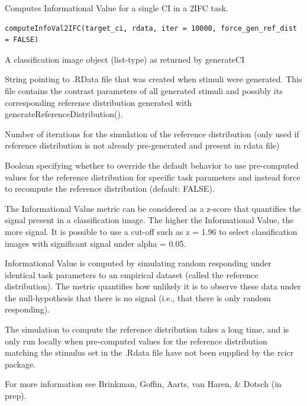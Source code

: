 \documentclass[letterpaper]{book}
\begin{document}
%
\begin{Description}
Computes Informational Value for a single CI in a 2IFC task.
\end{Description}
%
\begin{Usage}
\begin{verbatim}
computeInfoVal2IFC(target_ci, rdata, iter = 10000, force_gen_ref_dist = FALSE)
\end{verbatim}
\end{Usage}
%
\begin{Arguments}
\begin{ldescription}
\item[\code{target\_ci}] A classification image object (list-type) as returned by generateCI

\item[\code{rdata}] String pointing to .RData file that was created when stimuli were generated. This file contains the contrast parameters of all generated stimuli and possibly its corresponding reference distribution generated with generateReferenceDistribution().

\item[\code{iter}] Number of iterations for the simulation of the reference distribution (only used if reference distribution is not already pre-generated and present in rdata file)

\item[\code{force\_gen\_ref\_dist}] Boolean specifying whether to override the default behavior to use pre-computed values for the reference distribution for specific task parameters and instead force to recompute the reference distribution (default: FALSE).
\end{ldescription}
\end{Arguments}
%
\begin{Details}
The Informational Value metric can be considered as a z-score that quantifies the signal
present in a classification image. The higher the Informational Value, the more signal. It is
possible to use a cut-off such as z = 1.96 to select classification images with significant
signal under alpha = 0.05.

Informational Value is computed by simulating random responding under identical task parameters to
an empirical dataset (called the reference distribution). The metric quantifies how unlikely it is
to observe these data under the null-hypothesis that there is no signal (i.e., that there is only random responding).

The simulation to compute the reference distribution takes a long time, and is only run locally when
pre-computed values for the reference distribution matching the stimulus set in the .Rdata file have
not been supplied by the rcicr package.

For more information see Brinkman, Goffin, Aarts, van Haren, \& Dotsch (in prep).
\end{Details}
\end{document}
